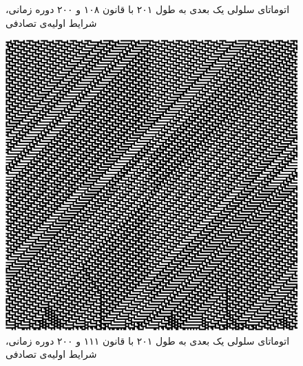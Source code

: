 \documentclass[11pt, a4paper]{article}
\begin{document}
\begin{figure}[!tbp]
\begin{minipage}[b]{0.3\textwidth}
    \caption{اتوماتای سلولی یک بعدی به طول ۲۰۱ با قانون ۱۰۸ و ۲۰۰ دوره زمانی، شرایط اولیه‌ی تصادفی}
    \label{fig:q3-108-rand}
  \end{minipage}
  \hfill
	\begin{minipage}[b]{0.3\textwidth}
	\includegraphics[width=\textwidth]{q3-111-rand}
    \caption{اتوماتای سلولی یک بعدی به طول ۲۰۱ با قانون ۱۱۱ و ۲۰۰ دوره زمانی، شرایط اولیه‌ی تصادفی}
	\label{fig:q3-111-rand}
  \end{minipage}
  \hfill
\end{figure}
\end{document}
